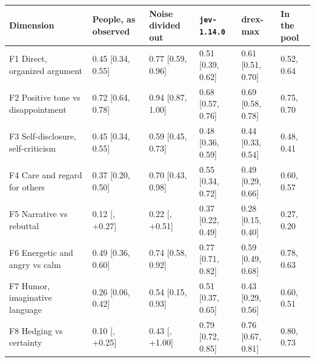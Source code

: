 {\scriptsize\setlength{\tabcolsep}{3.5pt}
\begin{tabular}{@{}l l l l l l@{}}
\toprule
Dimension & People, as observed & Noise divided out & \texttt{jev-1.14.0} & drex-max & In the pool \\
\midrule
F1 Direct, organized argument & 0.45 {\scriptsize[0.34, 0.55]} & 0.77 {\scriptsize[0.59, 0.96]} & 0.51 {\scriptsize[0.39, 0.62]} & 0.61 {\scriptsize[0.51, 0.70]} & 0.52, 0.64 \\
F2 Positive tone vs disappointment & 0.72 {\scriptsize[0.64, 0.78]} & 0.94 {\scriptsize[0.87, 1.00]} & 0.68 {\scriptsize[0.57, 0.76]} & 0.69 {\scriptsize[0.58, 0.78]} & 0.75, 0.70 \\
F3 Self-disclosure, self-criticism & 0.45 {\scriptsize[0.34, 0.55]} & 0.59 {\scriptsize[0.45, 0.73]} & 0.48 {\scriptsize[0.36, 0.59]} & 0.44 {\scriptsize[0.33, 0.54]} & 0.48, 0.41 \\
F4 Care and regard for others & 0.37 {\scriptsize[0.20, 0.50]} & 0.70 {\scriptsize[0.43, 0.98]} & 0.55 {\scriptsize[0.34, 0.72]} & 0.49 {\scriptsize[0.29, 0.66]} & 0.60, 0.57 \\
F5 Narrative vs rebuttal & 0.12 {\scriptsize[\textminus 0.04, +0.27]} & 0.22 {\scriptsize[\textminus 0.08, +0.51]} & 0.37 {\scriptsize[0.22, 0.49]} & 0.28 {\scriptsize[0.15, 0.40]} & 0.27, 0.20 \\
F6 Energetic and angry vs calm & 0.49 {\scriptsize[0.36, 0.60]} & 0.74 {\scriptsize[0.58, 0.92]} & 0.77 {\scriptsize[0.71, 0.82]} & 0.59 {\scriptsize[0.49, 0.68]} & 0.78, 0.63 \\
F7 Humor, imaginative language & 0.26 {\scriptsize[0.06, 0.42]} & 0.54 {\scriptsize[0.15, 0.93]} & 0.51 {\scriptsize[0.37, 0.65]} & 0.43 {\scriptsize[0.29, 0.56]} & 0.60, 0.51 \\
F8 Hedging vs certainty & 0.10 {\scriptsize[\textminus 0.07, +0.25]} & 0.43 {\scriptsize[\textminus 0.57, +1.00]} & 0.79 {\scriptsize[0.72, 0.85]} & 0.76 {\scriptsize[0.67, 0.81]} & 0.80, 0.73 \\
\bottomrule
\end{tabular}}
